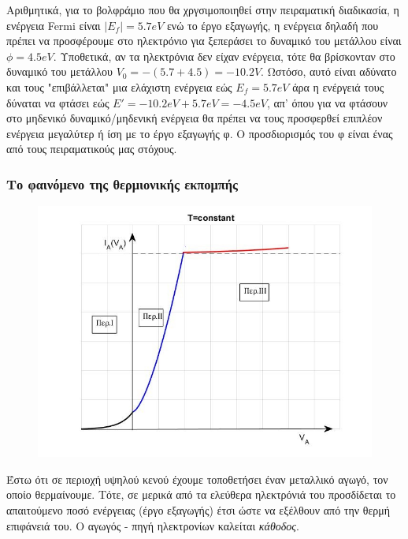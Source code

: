 \documentclass[a4paper]{article}
\begin{document}
%

Αριθμητικά, για το βολφράμιο που θα χργσιμοποιηθεί στην πειραματική διαδικασία, η ενέργεια Fermi είναι $|E_f|=5.7eV$ ενώ το έργο εξαγωγής, η ενέργεια δηλαδή που πρέπει να προσφέρουμε στο ηλεκτρόνιο για ξεπεράσει το δυναμικό του μετάλλου είναι $\phi=4.5eV$. Υποθετικά, αν τα ηλεκτρόνια δεν είχαν ενέργεια, τότε θα  βρίσκονταν στο δυναμικό του μετάλλου $V_0=-(5.7+4.5)=-10.2V$. Ωστόσο, αυτό είναι αδύνατο και τους "επιβάλλεται" μια ελάχιστη ενέργεια εώς $E_f=5.7eV$ άρα 
η ενέργειά τους δύναται να φτάσει εώς $E'=-10.2eV+5.7eV=-4.5eV$, απ' όπου για να φτάσουν στο μηδενικό δυναμικό/μηδενική ενέργεια θα πρέπει να τους προσφερθεί επιπλέον ενέργεια μεγαλύτερ ή ίση με το έργο εξαγωγής φ. Ο προσδιορισμός του φ είναι ένας από τους πειραματικούς μας στόχους.

\subsubsection*{Το φαινόμενο της θερμιονικής εκπομπής}
\begin{figure}
\includegraphics[width=1.0\linewidth]{i(v).jpg} 
\caption{ }
\label{fig:wrapfig}
\end{figure}
Έστω ότι σε περιοχή υψηλού κενού έχουμε τοποθετήσει έναν μεταλλικό αγωγό, τον οποίο θερμαίνουμε. Τότε, σε μερικά από τα ελεύθερα ηλεκτρόνιά του προσδίδεται το απαιτούμενο ποσό ενέργειας (έργο εξαγωγής) έτσι ώστε να εξέλθουν από την θερμή επιφάνειά του. Ο αγωγός - πηγή ηλεκτρονίων καλείται \textit{κάθοδος}. 
\end{document}
